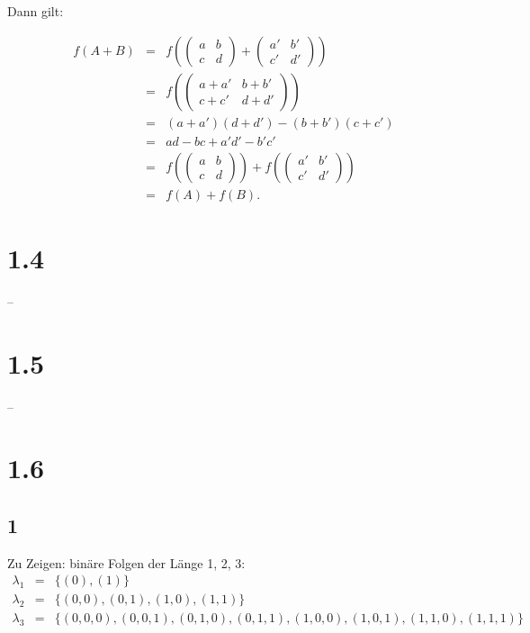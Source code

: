\documentclass[12pt]{article}
\begin{document}
Dann gilt:

\begin{eqnarray*}
f(A+B) &=& f( \left(  
    \begin{array}{ll} a & b \\
     c & d   \end{array}\right)
     +
    \left( 
        \begin{array}{ll} 
        a' & b' \\
         c' & d'  
         \end{array} \right)     
     )\\
     &=& f(
    \left( 
        \begin{array}{ll} 
        a+a' & b+b' \\
         c+c' & d+d'  
         \end{array} \right)  
     ) \\
     &=& (a+a')(d+d')-(b+b')(c+c')\\
     &=&
     ad - bc + a'd' - b'c' \\
     &=&  f(
         \left(  
    \begin{array}{ll} a & b \\
     c & d   \end{array}\right) 
     ) + f(
             \left( 
        \begin{array}{ll} 
        a' & b' \\
         c' & d'  
         \end{array} \right)     
     ) \\
     &=& f(A)+f(B).
\end{eqnarray*}

\section*{1.4}
--

\section*{1.5}
--
\newpage
\section*{1.6}
\subsection*{1}
Zu Zeigen: binäre Folgen der Länge 1, 2, 3:
\begin{eqnarray*}
\lambda_1 &=& \{(0), (1)\} \\
\lambda_2 &=& \{(0,0), (0,1), (1,0), (1,1)\} \\
\lambda_3 &=& \{(0,0,0),(0,0,1),(0,1,0),(0,1,1),(1,0,0),(1,0,1),(1,1,0),(1,1,1)\}
\end{eqnarray*}
\end{document}
